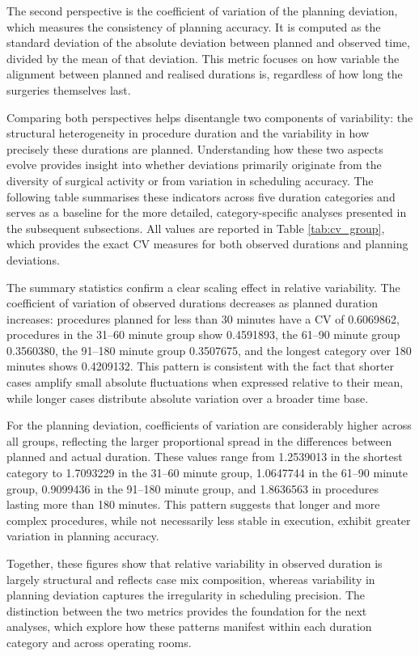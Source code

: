 \documentclass[
]{article}
\begin{document}
The second perspective is the coefficient of variation of the planning
deviation, which measures the consistency of planning accuracy. It is
computed as the standard deviation of the absolute deviation between
planned and observed time, divided by the mean of that deviation. This
metric focuses on how variable the alignment between planned and
realised durations is, regardless of how long the surgeries themselves
last.

Comparing both perspectives helps disentangle two components of
variability: the structural heterogeneity in procedure duration and the
variability in how precisely these durations are planned. Understanding
how these two aspects evolve provides insight into whether deviations
primarily originate from the diversity of surgical activity or from
variation in scheduling accuracy. The following table summarises these
indicators across five duration categories and serves as a baseline for
the more detailed, category-specific analyses presented in the
subsequent subsections. All values are reported in Table
\ref{tab:cv_group}, which provides the exact CV measures for both
observed durations and planning deviations.

The summary statistics confirm a clear scaling effect in relative
variability. The coefficient of variation of observed durations
decreases as planned duration increases: procedures planned for less
than 30 minutes have a CV of 0.6069862, procedures in the 31--60 minute
group show 0.4591893, the 61--90 minute group 0.3560380, the 91--180
minute group 0.3507675, and the longest category over 180 minutes shows
0.4209132. This pattern is consistent with the fact that shorter cases
amplify small absolute fluctuations when expressed relative to their
mean, while longer cases distribute absolute variation over a broader
time base.

For the planning deviation, coefficients of variation are considerably
higher across all groups, reflecting the larger proportional spread in
the differences between planned and actual duration. These values range
from 1.2539013 in the shortest category to 1.7093229 in the 31--60
minute group, 1.0647744 in the 61--90 minute group, 0.9099436 in the
91--180 minute group, and 1.8636563 in procedures lasting more than 180
minutes. This pattern suggests that longer and more complex procedures,
while not necessarily less stable in execution, exhibit greater
variation in planning accuracy.

Together, these figures show that relative variability in observed
duration is largely structural and reflects case mix composition,
whereas variability in planning deviation captures the irregularity in
scheduling precision. The distinction between the two metrics provides
the foundation for the next analyses, which explore how these patterns
manifest within each duration category and across operating rooms.
\end{document}

